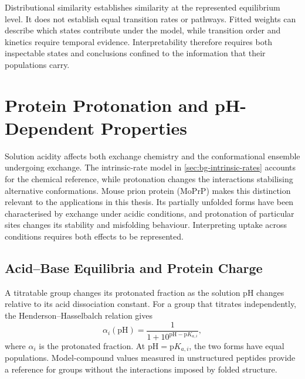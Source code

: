 Distributional similarity establishes similarity at the represented equilibrium level. It does not establish equal transition rates or pathways.\supercite{tibertiENCORESoftwareQuantitative2015} Fitted weights can describe which states contribute under the model, while transition order and kinetics require temporal evidence. Interpretability therefore requires both inspectable states and conclusions confined to the information that their populations carry.

\section{Protein Protonation and pH-Dependent Properties}
\label{sec:bg-protonation}

Solution acidity affects both exchange chemistry and the conformational ensemble undergoing exchange. The intrinsic-rate model in \cref{sec:bg-intrinsic-rates} accounts for the chemical reference, while protonation changes the interactions stabilising alternative conformations. Mouse prion protein (MoPrP) makes this distinction relevant to the applications in this thesis. Its partially unfolded forms have been characterised by exchange under acidic conditions, and protonation of particular sites changes its stability and misfolding behaviour.\supercite{moulickPartiallyUnfoldedForms2015,singhUnravelingMolecularMechanism2016} Interpreting uptake across conditions requires both effects to be represented.

\subsection{Acid--Base Equilibria and Protein Charge}
\label{sec:bg-acid-base}

A titratable group changes its protonated fraction as the solution pH changes relative to its acid dissociation constant. For a group that titrates independently, the Henderson--Hasselbalch relation gives
\begin{equation}
    \alpha_i(\mathrm{pH})=
    \frac{1}{1+10^{\mathrm{pH}-\mathrm{p}K_{a,i}}},
    \label{eq:bg-henderson-hasselbalch}
\end{equation}
where $\alpha_i$ is the protonated fraction. At $\mathrm{pH}=\mathrm{p}K_{a,i}$, the two forms have equal populations. Model-compound values measured in unstructured peptides provide a reference for groups without the interactions imposed by folded structure.\supercite{thurlkillPKValuesIonizable2006}

